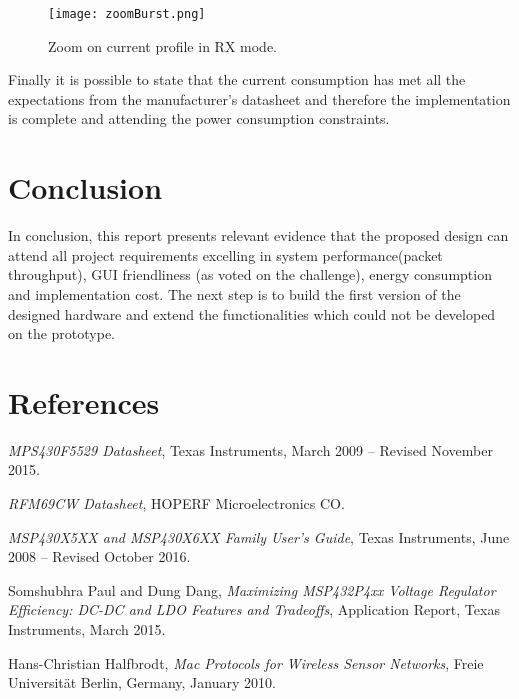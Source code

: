\documentclass[12pt]{article}
\begin{document}
\begin{figure}[H]
    \centering
    \texttt{[image: zoomBurst.png]}
    \caption{Zoom on current profile in RX mode.}
    \label{fig:zoomBurst}
\end{figure}

Finally it is possible to state that the current consumption has met all the expectations from the manufacturer's datasheet and therefore the implementation is complete and attending the power consumption constraints.

\newpage
\section{Conclusion}
\label{conclusion}
In conclusion, this report presents relevant evidence that the proposed design can attend all project requirements excelling in system performance(packet throughput), GUI friendliness (as voted on the challenge), energy consumption and implementation cost. The next step is to build the first version of the designed hardware and extend the functionalities which could not be developed on the prototype.

\newpage

\section{References}
\label{references}
\begin{thebibliography}{9}

  \textit{MPS430F5529 Datasheet},
  Texas Instruments,
  March 2009 – Revised November 2015.
  
  \textit{RFM69CW Datasheet},
  HOPERF Microelectronics CO.

  \textit{MSP430X5XX and MSP430X6XX Family User's Guide},
  Texas Instruments,
  June 2008 – Revised October 2016.

  Somshubhra Paul and Dung Dang,
  \textit{Maximizing MSP432P4xx Voltage Regulator Efficiency: DC-DC and LDO Features and Tradeoffs},
  Application Report,
  Texas Instruments,
  March 2015.

  Hans-Christian Halfbrodt,
  \textit{Mac Protocols for Wireless Sensor Networks},
  Freie Universit{\"a}t Berlin, Germany,
  January 2010.


\end{thebibliography}
\end{document}
